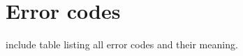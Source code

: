 \chapter{Error codes}
\label{app:error-codes}
include table listing all error codes and their meaning.